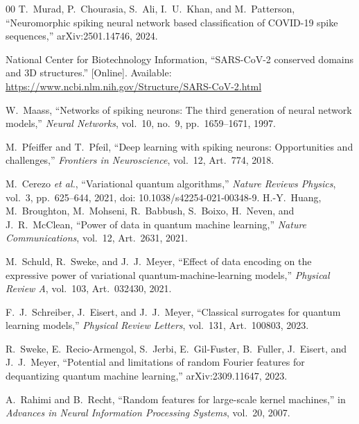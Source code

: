 \documentclass[conference]{IEEEtran}
\begin{document}
\FloatBarrier
\begin{thebibliography}{00}
T.~Murad, P.~Chourasia, S.~Ali, I.~U.~Khan, and M.~Patterson,
``Neuromorphic spiking neural network based classification of COVID-19 spike sequences,''
arXiv:2501.14746, 2024.

National Center for Biotechnology Information,
``SARS-CoV-2 conserved domains and 3D structures.''
[Online]. Available: \url{https://www.ncbi.nlm.nih.gov/Structure/SARS-CoV-2.html}

W.~Maass,
``Networks of spiking neurons: The third generation of neural network models,''
\textit{Neural Networks}, vol.~10, no.~9, pp.~1659--1671, 1997.

M.~Pfeiffer and T.~Pfeil,
``Deep learning with spiking neurons: Opportunities and challenges,''
\textit{Frontiers in Neuroscience}, vol.~12, Art.~774, 2018.

M.~Cerezo \textit{et al.},
``Variational quantum algorithms,''
\textit{Nature Reviews Physics}, vol.~3, pp.~625--644, 2021,
doi: 10.1038/s42254-021-00348-9.
H.-Y.~Huang, M.~Broughton, M.~Mohseni, R.~Babbush, S.~Boixo, H.~Neven, and J.~R.~McClean,
``Power of data in quantum machine learning,''
\textit{Nature Communications}, vol.~12, Art.~2631, 2021.

M.~Schuld, R.~Sweke, and J.~J.~Meyer,
``Effect of data encoding on the expressive power of variational quantum-machine-learning models,''
\textit{Physical Review A}, vol.~103, Art.~032430, 2021.

F.~J.~Schreiber, J.~Eisert, and J.~J.~Meyer,
``Classical surrogates for quantum learning models,''
\textit{Physical Review Letters}, vol.~131, Art.~100803, 2023.

R.~Sweke, E.~Recio-Armengol, S.~Jerbi, E.~Gil-Fuster, B.~Fuller, J.~Eisert, and J.~J.~Meyer,
``Potential and limitations of random Fourier features for dequantizing quantum machine learning,''
arXiv:2309.11647, 2023.

A.~Rahimi and B.~Recht,
``Random features for large-scale kernel machines,''
in \textit{Advances in Neural Information Processing Systems}, vol.~20, 2007.


\end{thebibliography}
\end{document}
